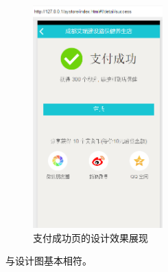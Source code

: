         \begin{figure}[htbp]
          \centering
          \includegraphics[width=5cm]{./img/pay_successful_my.png}
          \caption{支付成功页的设计效果展现}
          \label{fig:pay_successful_my}
        \end{figure}
        与设计图基本相符。

    \clearpage
